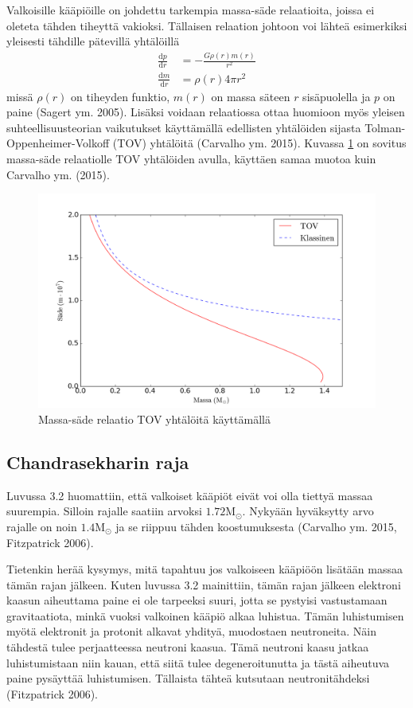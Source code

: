 \documentclass[12pt,a4paper,titlepage]{article}
\begin{document}
Valkoisille kääpiöille on johdettu tarkempia massa-säde relaatioita, joissa ei oleteta tähden tiheyttä vakioksi. Tällaisen relaation johtoon voi lähteä esimerkiksi yleisesti tähdille pätevillä yhtälöillä
\begin{align}
\frac{\mathrm{d}p}{\mathrm{d}r} &= - \frac{G \rho(r) m(r)}{r^2} \\
\frac{\mathrm{d}m}{\mathrm{d}r} &= \rho(r) 4 \pi r^2
\end{align}
missä $\rho(r)$ on tiheyden funktio, $m(r)$ on massa säteen $r$ sisäpuolella ja $p$ on paine (Sagert ym. 2005). Lisäksi voidaan relaatiossa ottaa huomioon myös yleisen suhteellisuusteorian vaikutukset käyttämällä edellisten yhtälöiden sijasta Tolman-Oppenheimer-Volkoff (TOV) yhtälöitä (Carvalho ym. 2015). Kuvassa \ref{pic:2} on sovitus massa-säde relaatiolle TOV yhtälöiden avulla, käyttäen samaa muotoa kuin Carvalho ym. (2015).
\begin{figure}[H]
\centering
\includegraphics[width=\textwidth]{mr2.png}
\caption{Massa-säde relaatio TOV yhtälöitä käyttämällä}
\label{pic:2}
\end{figure}

\subsection{Chandrasekharin raja}
Luvussa 3.2 huomattiin, että valkoiset kääpiöt eivät voi olla tiettyä massaa suurempia. Silloin rajalle saatiin arvoksi $1.72 \mathrm{M}_{\odot}$. Nykyään hyväksytty arvo rajalle on noin $1.4 \mathrm{M}_{\odot}$ ja se riippuu tähden koostumuksesta (Carvalho ym. 2015, Fitzpatrick 2006). 

Tietenkin herää kysymys, mitä tapahtuu jos valkoiseen kääpiöön lisätään massaa tämän rajan jälkeen. Kuten luvussa 3.2 mainittiin, tämän rajan jälkeen elektroni kaasun aiheuttama paine ei ole tarpeeksi suuri, jotta se pystyisi vastustamaan gravitaatiota, minkä vuoksi valkoinen kääpiö alkaa luhistua. Tämän luhistumisen myötä elektronit ja protonit alkavat yhdityä, muodostaen neutroneita. Näin tähdestä tulee perjaatteessa neutroni kaasua. Tämä neutroni kaasu jatkaa luhistumistaan niin kauan, että siitä tulee degeneroitunutta ja tästä aiheutuva paine pysäyttää luhistumisen. Tällaista tähteä kutsutaan neutronitähdeksi (Fitzpatrick 2006).
\end{document}
